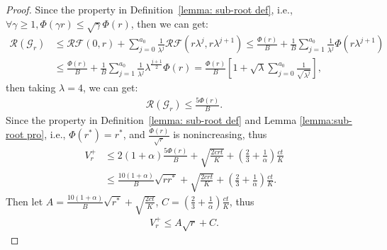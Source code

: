 \documentclass{article}
\begin{document}
\begin{proof}
Since the property in Definition~\ref{lemma: sub-root def}, i.e., $\forall \gamma \geq 1, \Phi(\gamma r) \leq \sqrt{\gamma} \Phi(r)$,  then we can get: 
\begin{align*}
    \mathcal{R}(\mathcal{G}_r) & \leq \mathcal{R} \mathcal{F} (0,r) + \sum _{j=0} ^{a_0} \frac{1}{\lambda^j} \mathcal{R} \mathcal{F}(r \lambda^j, r \lambda^{j+1} ) 
     \leq \frac{\Phi(r)}{B} + \frac{1}{B} \sum _{j=1} ^{a_0} \frac{1}{\lambda^j} \Phi (r \lambda^{j+1}) \\
    & \leq \frac{\Phi(r)}{B} +  \frac{1}{B} \sum _{j=1} ^{a_0} \frac{1}{\lambda^j} \lambda^{\frac{j+1}{2}} \Phi (r) 
     = \frac{\Phi(r)}{B} \left[ 1 + \sqrt{\lambda} \sum _{j=0}^{a_0} \frac{1}{\sqrt{\lambda^j}}   \right],
\end{align*}
then taking $\lambda = 4$, we can get: 
\begin{align*}
    \mathcal{R}(\mathcal{G}_r) \leq \frac{5\Phi(r)}{B}.
\end{align*}
Since the property in Definition~\ref{lemma: sub-root def} and Lemma \ref{lemma:sub-root pro}, i.e., $\Phi(r^*) = r^*$, and $\frac{\Phi(r)}{\sqrt{r}}$ is nonincreasing, thus
\begin{align*}
    V_r^+ & \leq 2(1+\alpha) \frac{5\Phi(r)}{B} +\sqrt{\frac{2crt}{K}} + (\frac{2}{3} +\frac{1}{\alpha}) \frac{ct}{K} \\
    & \leq \frac{10(1+\alpha)}{B} \sqrt{r r^*} + \sqrt{\frac{2crt}{K}} + (\frac{2}{3} +\frac{1}{\alpha}) \frac{ct}{K}.
\end{align*}
Then let $A = \frac{10(1+\alpha)}{B} \sqrt{r^*} + \sqrt{\frac{2ct}{K}} $, $C = (\frac{2}{3} +\frac{1}{\alpha}) \frac{ct}{K} $, thus
\begin{align*}
    V_r^+ \leq A \sqrt{r} + C.
\end{align*}


\end{proof}
\end{document}
